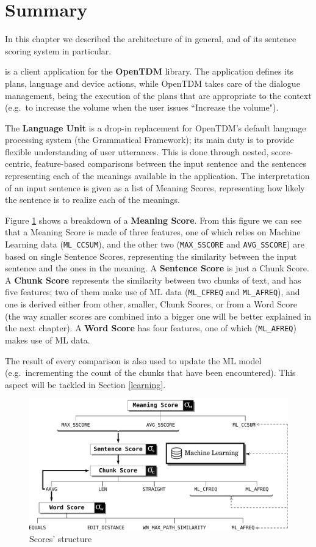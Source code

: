 \section{Summary}\label{ch:arch:LU:summary}
In this chapter we described the architecture of \pname in general, and of its sentence scoring system in particular.

\pname is a client application for the \textbf{OpenTDM} library. The application defines its plans, language and device actions, while OpenTDM takes care of the dialogue management, being the execution of the plans that are appropriate to the context (e.g.\ to increase the volume when the user issues ``Increase the volume").

The \textbf{Language Unit} is a drop-in replacement for OpenTDM's default language processing system (the Grammatical Framework); its main duty is to provide flexible understanding of user utterances. This is done through nested, score-centric, feature-based comparisons between the input sentence and the sentences representing each of the meanings available in the application. The interpretation of an input sentence is given as a list of Meaning Scores, representing how likely the sentence is to realize each of the meanings.

Figure \ref{scoresbreakdown} shows a breakdown of a \textbf{Meaning Score}. From this figure we can see that a Meaning Score is made of three features, one of which relies on Machine Learning data (\texttt{ML\_CCSUM}), and the other two (\texttt{MAX\_SSCORE} and \texttt{AVG\_SSCORE}) are based on single Sentence Scores, representing the similarity between the input sentence and the ones in the meaning. A \textbf{Sentence Score} is just a Chunk Score. A \textbf{Chunk Score} represents the similarity between two chunks of text, and has five features; two of them make use of ML data (\texttt{ML\_CFREQ} and \texttt{ML\_AFREQ}), and one is derived either from other, smaller, Chunk Scores, or from a Word Score (the way smaller scores are combined into a bigger one will be better explained in the next chapter). A \textbf{Word Score} has four features, one of which (\texttt{ML\_AFREQ}) makes use of ML data.

The result of every comparison is also used to update the ML model (e.g.\ incrementing the count of the chunks that have been encountered). This aspect will be tackled in Section \ref{learning}.


\begin{figure}
\includegraphics[width=23cm]{Pictures/scores_diagram.pdf}
\caption{Scores' structure}
\label{scoresbreakdown}
\end{figure}